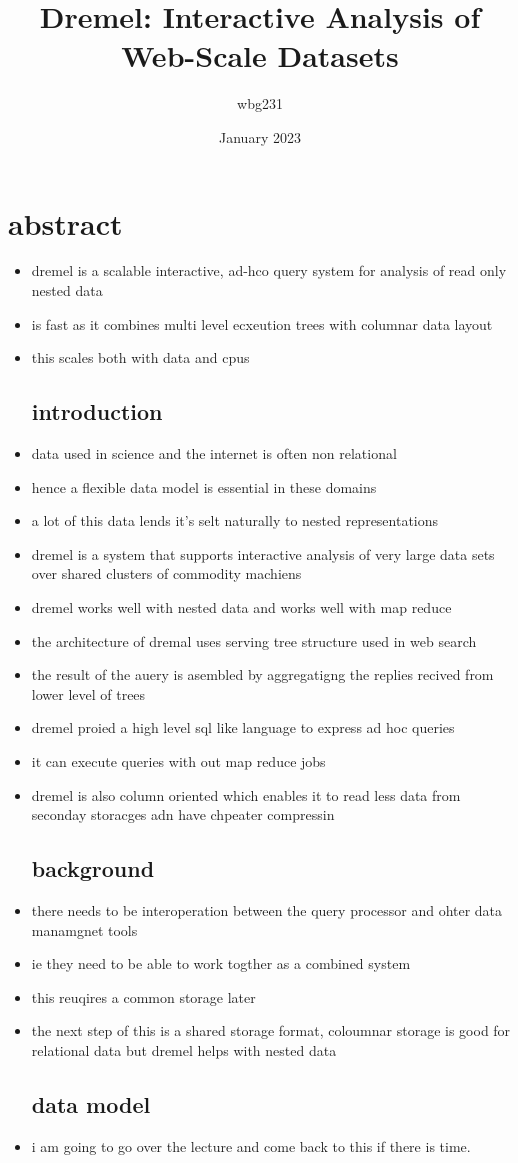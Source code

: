\documentclass{article}
\title{Dremel: Interactive Analysis of Web-Scale Datasets }
\author{wbg231 }
\date{January 2023}
\begin{document}
\maketitle

\section{abstract}
\begin{itemize}
\item dremel is a scalable interactive, ad-hco query system for analysis of read only nested data 
\item is fast as it combines multi level ecxeution trees with columnar data layout
\item this scales both with data and cpus
\subsection*{introduction }
\item data used in science and the internet is often non relational 
\item hence a flexible data model is essential in these domains 
\item a lot of this data lends it's selt naturally to nested representations 
\item dremel is a system that supports interactive analysis of very large data sets over shared clusters of commodity machiens 
\item dremel works well with nested data and works well with map reduce
\item the architecture of dremal uses serving tree structure used in web search 
\item the result of the auery is asembled by aggregatigng the replies recived from lower level of trees 
\item dremel proied a high level sql like language to express ad hoc queries 
\item it can execute queries with out map reduce jobs 
\item dremel is also column oriented which enables it to read less data from seconday storacges adn have chpeater compressin
\subsection*{background }
\item there needs to be interoperation between the query processor and ohter data manamgnet tools
\item ie they need to be able to work togther as a combined system
\item this reuqires a common storage later 
\item the next step of this is a shared storage format, coloumnar storage is good for relational data but dremel helps with nested data 
\subsection*{data model}
\item i am going to go over the lecture and come back to this if there is time. 
\end{itemize}
\end{document}

